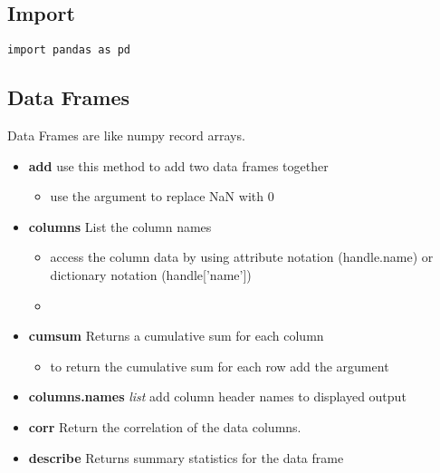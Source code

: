\subsection{Import}
\begin{lstlisting}
import pandas as pd
\end{lstlisting}

\subsection{Data Frames}
Data Frames are like numpy record arrays.
\begin{itemize}

  \item \textbf{add} use this method to add two data frames together
    \begin{itemize}
      \item use the {\color{red}{fill\_value=0}} argument to replace NaN with 0
    \end{itemize}

  \item \textbf{columns} List the column names
    \begin{itemize}

      \item access the column data by using attribute notation (handle.name) or
        dictionary notation (handle['name'])

      \item \color{red}{If the column name is more than one word you must use
        the dictionary notation}
    \end{itemize}

  \item \textbf{cumsum} Returns a cumulative sum for each column
    \begin{itemize}

      \item to return the cumulative sum for each row add the argument
        \color{red}{axis=1}
    \end{itemize}

  \item \textbf{columns.names} \textit{list} add column header names to
    displayed output

  \item \textbf{corr} Return the correlation of the data columns.

  \item \textbf{describe} Returns summary statistics for the data frame


\end{itemize}

